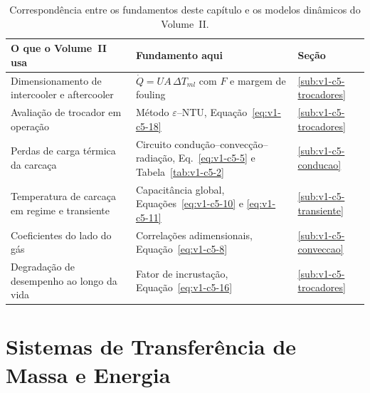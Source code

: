 \documentclass[12pt,a4paper]{article}
\numberwithin{equation}{section}
\numberwithin{table}{section}
\numberwithin{figure}{section}
\begin{document}
\begin{table}[H]
\centering
\caption[Correspondência entre os fundamentos deste capítulo e os modelos do
Volume II.]{Correspondência entre os fundamentos deste capítulo e os modelos
dinâmicos do Volume~II.}
\label{tab:v1-c5-4}
\begin{tabular}{@{}lp{4.9cm}l@{}}
\toprule
\textbf{O que o Volume~II usa} & \textbf{Fundamento aqui} & \textbf{Seção} \\
\midrule
Dimensionamento de intercooler e aftercooler & $\dot{Q} = UA\,\Delta T_{ml}$
com $F$ e margem de fouling & \ref{sub:v1-c5-trocadores} \\
Avaliação de trocador em operação & Método $\varepsilon$--NTU,
Equação~\eqref{eq:v1-c5-18} & \ref{sub:v1-c5-trocadores} \\
Perdas de carga térmica da carcaça & Circuito
condução--convecção--radiação, Eq.~\eqref{eq:v1-c5-5} e
Tabela~\ref{tab:v1-c5-2} & \ref{sub:v1-c5-conducao} \\
Temperatura de carcaça em regime e transiente & Capacitância global,
Equações~\eqref{eq:v1-c5-10} e \eqref{eq:v1-c5-11} &
\ref{sub:v1-c5-transiente} \\
Coeficientes do lado do gás & Correlações adimensionais,
Equação~\eqref{eq:v1-c5-8} & \ref{sub:v1-c5-conveccao} \\
Degradação de desempenho ao longo da vida & Fator de incrustação,
Equação~\eqref{eq:v1-c5-16} & \ref{sub:v1-c5-trocadores} \\
\bottomrule
\end{tabular}
\end{table}

\section{Sistemas de Transferência de Massa e Energia}\label{sec:sistemas}

\end{document}
